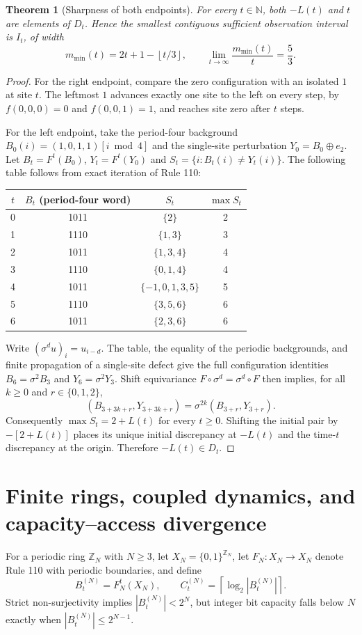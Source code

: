 \documentclass[11pt,a4paper]{article}
\newtheorem{theorem}{Theorem}[section]
\theoremstyle{definition}
\theoremstyle{remark}
\newcommand{\Z}{\mathbb{Z}}
\newcommand{\N}{\mathbb{N}}
\newcommand{\xor}{\oplus}
\begin{document}
\begin{theorem}[Sharpness of both endpoints]\label{thm:sharp}
For every $t\in\N$, both $-L(t)$ and $t$ are elements of $D_t$. Hence the smallest contiguous sufficient observation interval is $I_t$, of width
\[
 m_{\min}(t)=2t+1-\left\lfloor t/3\right\rfloor,
 \qquad \lim_{t\to\infty}\frac{m_{\min}(t)}{t}=\frac53.
\]
\end{theorem}
\begin{proof}
For the right endpoint, compare the zero configuration with an isolated $1$ at site $t$. The leftmost $1$ advances exactly one site to the left on every step, by $f(0,0,0)=0$ and $f(0,0,1)=1$, and reaches site zero after $t$ steps.

For the left endpoint, take the period-four background $B_0(i)=(1,0,1,1)[i\bmod 4]$ and the single-site perturbation $Y_0=B_0\xor e_2$. Let $B_t=F^t(B_0)$, $Y_t=F^t(Y_0)$ and $S_t=\{i:B_t(i)\ne Y_t(i)\}$. The following table follows from exact iteration of Rule 110:
\begin{center}
\begin{tabular}{@{}cccc@{}}\toprule
$t$ & $B_t$ (period-four word) & $S_t$ & $\max S_t$ \\\midrule
0 & 1011 & $\{2\}$ & 2 \\
1 & 1110 & $\{1,3\}$ & 3 \\
2 & 1011 & $\{1,3,4\}$ & 4 \\
3 & 1110 & $\{0,1,4\}$ & 4 \\
4 & 1011 & $\{-1,0,1,3,5\}$ & 5 \\
5 & 1110 & $\{3,5,6\}$ & 6 \\
6 & 1011 & $\{2,3,6\}$ & 6 \\\bottomrule
\end{tabular}
\end{center}
Write $(\sigma^d u)_i=u_{i-d}$. The table, the equality of the periodic backgrounds, and finite propagation of a single-site defect give the full configuration identities $B_6=\sigma^2 B_3$ and $Y_6=\sigma^2 Y_3$. Shift equivariance $F\circ\sigma^d=\sigma^d\circ F$ then implies, for all $k\ge0$ and $r\in\{0,1,2\}$,
\[
 (B_{3+3k+r},Y_{3+3k+r})=\sigma^{2k}(B_{3+r},Y_{3+r}).
\]
Consequently $\max S_t=2+L(t)$ for every $t\ge0$. Shifting the initial pair by $-[2+L(t)]$ places its unique initial discrepancy at $-L(t)$ and the time-$t$ discrepancy at the origin. Therefore $-L(t)\in D_t$.
\end{proof}

\section{Finite rings, coupled dynamics, and capacity--access divergence}
For a periodic ring $\Z_N$ with $N\ge3$, let $X_N=\{0,1\}^{\Z_N}$, let $F_N:X_N\to X_N$ denote Rule 110 with periodic boundaries, and define
\[
 B_t^{(N)}=F_N^t(X_N),\qquad C_t^{(N)}=\left\lceil\log_2|B_t^{(N)}|\right\rceil.
\]
Strict non-surjectivity implies $|B_t^{(N)}|<2^N$, but integer bit capacity falls below $N$ exactly when $|B_t^{(N)}|\le2^{N-1}$.
\end{document}
